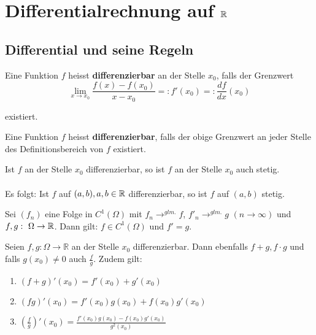 \chapter{Differentialrechnung auf $\mathbb{R}$}
\section{Differential und seine Regeln}

\begin{definition}[Differenzierbarkeit]
	Eine Funktion $f$ heisst \textbf{differenzierbar} an der Stelle $x_0$, falls der Grenzwert
	$$\lim_{x \to x_0} \frac{f(x)- f(x_0)}{x-x_0}=: f'(x_0) =: \frac{df}{dx}(x_0)$$
    
existiert.
	
	Eine Funktion $f$ heisst \textbf{differenzierbar}, falls der obige Grenzwert an jeder Stelle des Definitionsbereich von $f$ existiert.
\end{definition}


\begin{theorem}
Ist $f$ an der Stelle $x_0$ differenzierbar, so ist $f$ an der Stelle $x_0$ auch stetig.
\\\\
Es folgt: Ist $f$ auf $(a,b), a,b\in \mathbb{R}$ differenzierbar, so ist $f$ auf $(a,b)$ stetig.
\end{theorem}

\begin{theorem}
Sei $(f_n)$ eine Folge in $C^1(\Omega)$ mit $f_n \to^{glm.} f$, $f'_n \to^{glm.} g$ $(n\to \infty)$ und $f,g: \ \Omega \to \mathbb{R}$.
Dann gilt: $f\in C^1(\Omega)$ und $f' = g$.
\end{theorem}

\begin{theorem}
    Seien $f,g: \Omega \rightarrow \mathbb{R}$ an der Stelle $x_0$ differenzierbar. Dann ebenfalls $f+g,f\cdot g$ und falls $g(x_0) \neq 0$ auch $\frac{f}{g}$. Zudem gilt:

	\begin{enumerate}
		\item $(f+g)'(x_0)= f'(x_0)+g'(x_0)$
	
		\item $(fg)'(x_0) = f'(x_0)g(x_0)+f(x_0)g'(x_0)$
		
		\item  $(\frac{f}{g})'(x_0)= \frac{f'(x_0)g(x_0)-f(x_0)g'(x_0)}{g^2(x_0)}$
	\end{enumerate}
\end{theorem}

